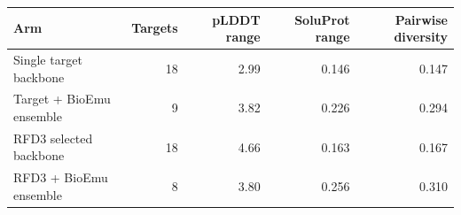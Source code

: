 \begin{tabular}{lrrrr}
\toprule
Arm & Targets & pLDDT range & SoluProt range & Pairwise diversity \\
\midrule
Single target backbone & 18 & 2.99 & 0.146 & 0.147 \\
Target + BioEmu ensemble & 9 & 3.82 & 0.226 & 0.294 \\
RFD3 selected backbone & 18 & 4.66 & 0.163 & 0.167 \\
RFD3 + BioEmu ensemble & 8 & 3.80 & 0.256 & 0.310 \\
\bottomrule
\end{tabular}
